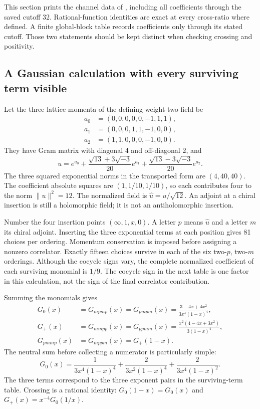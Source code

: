 This section prints the channel data of
, including all
coefficients through the saved cutoff 32. Rational-function
identities are exact at every cross-ratio where defined. A finite
global-block table records coefficients only through its stated
cutoff. Those two statements should be kept distinct when checking
crossing and positivity.

\subsection{A Gaussian calculation with every surviving term visible}

Let the three lattice momenta of the defining weight-two field be
\begin{align*}
 a_0&=(0,0,0,0,0,-1,1,1),\\
 a_1&=(0,0,0,1,1,-1,0,0),\\
 a_2&=(1,1,0,0,0,-1,0,0).
\end{align*}
They have Gram matrix with diagonal 4 and off-diagonal 2, and
\[
 u=e^{a_0}+\frac{\sqrt{13}+3\sqrt{-3}}{20}e^{a_1}
            +\frac{\sqrt{13}-3\sqrt{-3}}{20}e^{a_2}.
\]
The three squared exponential norms in the transported form are
$(4,40,40)$. The coefficient absolute squares are $(1,1/10,1/10)$,
so each contributes four to the norm $\|u\|^2=12$. The normalized
field is $\widehat u=u/\sqrt{12}$. An adjoint at a chiral insertion
is still a holomorphic field; it is not an antiholomorphic insertion.

Number the four insertion points $(\infty,1,x,0)$. A letter $p$
means $\widehat u$ and a letter $m$ its chiral adjoint. Inserting
the three exponential terms at each position gives 81 choices per
ordering. Momentum conservation is imposed before assigning a
nonzero correlator. Exactly fifteen choices survive in each of the
six two-$p$, two-$m$ orderings. Although the cocycle signs vary,
the complete normalized coefficient of each surviving monomial is
$1/9$. The cocycle sign in the next table is one factor in this
calculation, not the sign of the final correlator contribution.



Summing the monomials gives
\begin{align}
 G_0(x)&=G_{mpmp}(x)=G_{pmpm}(x)
       =\frac{3-4x+4x^2}{3x^4(1-x)^4},\\
 G_+(x)&=G_{mmpp}(x)=G_{ppmm}(x)
       =\frac{x^2(4-4x+3x^2)}{3(1-x)^4},\\
 G_{pmmp}(x)&=G_{mppm}(x)=G_+(1-x).
 \label{expphysics:all-u-orderings}
\end{align}
The neutral sum before collecting a numerator is particularly
simple:
\[
 G_0(x)=\frac1{3x^4(1-x)^4}
       +\frac2{3x^2(1-x)^4}
       +\frac2{3x^4(1-x)^2}.
\]
The three terms correspond to the three exponent pairs in the
surviving-term table. Crossing is a rational identity:
$G_0(1-x)=G_0(x)$ and $G_+(x)=x^{-4}G_0(1/x)$.


